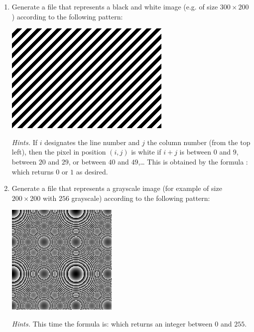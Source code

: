 \documentclass[11pt,class=report,crop=false]{standalone}
\begin{document}
\begin{activite}



\begin{enumerate}
  \item Generate a file  that represents a black and white image (e.g. of size $300 \times 200$) according to the following pattern:
\begin{center}
\includegraphics[scale=\myscale,scale=0.5]{screen-image_nb}
\end{center}   

\emph{Hints.} If $i$ designates the line number and $j$ the column number (from the top left), then the pixel in position $(i,j)$ is white if $i+j$ is between $0$ and $9$, between $20$ and $29$, or between $40$ and $49$,\ldots{} This is obtained by the formula :
which returns $0$ or $1$ as desired.

  \item Generate a file  that represents a grayscale image (for example of size $200 \times 200$ with $256$ grayscale) according to the following pattern:
\begin{center}
\includegraphics[scale=\myscale,scale=0.7]{screen-image_gris}
\end{center}   

\emph{Hints.} This time the formula is:
which returns an integer between $0$ and $255$.


\end{enumerate}
\end{activite}
\end{document}
